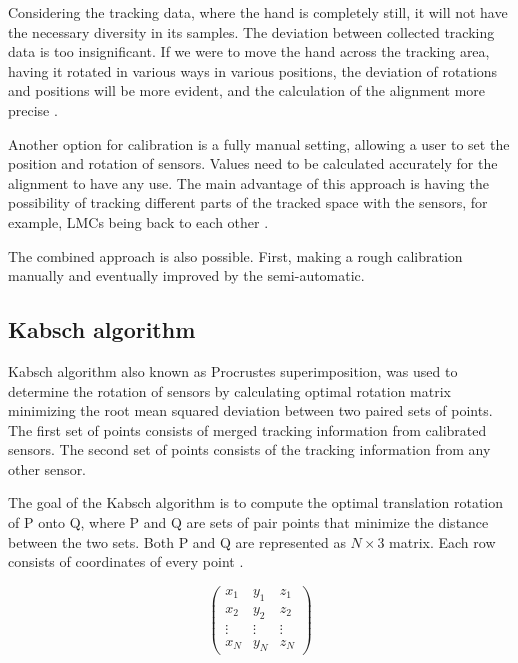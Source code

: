 Considering the tracking data, where the hand is completely still, it will not have the necessary diversity in its samples. The deviation between collected tracking data is too insignificant. If we were to move the hand across the tracking area, having it rotated in various ways in various positions, the deviation of rotations and positions will be more evident, and the calculation of the alignment more precise \cite{tomasMultileap}.

Another option for calibration is a fully manual setting, allowing a user to set the position and rotation of sensors. Values need to be calculated accurately for the alignment to have any use. The main advantage of this approach is having the possibility of tracking different parts of the tracked space with the sensors, for example, LMCs being back to each other \cite{tomasMultileap}.

The combined approach is also possible. First, making a rough calibration manually and eventually improved by the semi-automatic.

\subsection{Kabsch algorithm}

Kabsch algorithm \cite{kabsch} also known as Procrustes superimposition, was used to determine the rotation of sensors by calculating optimal rotation matrix minimizing the root mean squared deviation between two paired sets of points. The first set of points consists of merged tracking information from calibrated sensors. The second set of points consists of the tracking information from any other sensor. \cite{tomasMultileap}

The goal of the Kabsch algorithm is to compute the optimal translation rotation of P onto Q, where P and Q are sets of pair points that minimize the distance between the two sets. Both P and Q are represented as $N \times 3$ matrix. Each row consists of coordinates of every point \cite{tomasMultileap}.

\begin{equation}
    \begin{pmatrix}
        x_1 & y_1 & z_1\\
        x_2 & y_2 & z_2\\
        \vdots & \vdots & \vdots\\
        x_N & y_N & z_N
    \end{pmatrix}
\end{equation}

